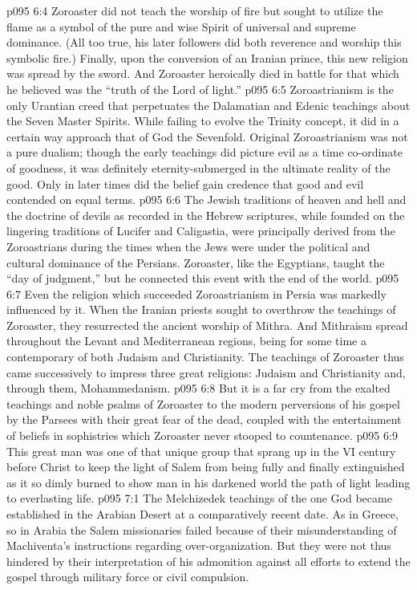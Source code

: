 \vs p095 6:4 Zoroaster did not teach the worship of fire but sought to utilize the flame as a symbol of the pure and wise Spirit of universal and supreme dominance. (All too true, his later followers did both reverence and worship this symbolic fire.) Finally, upon the conversion of an Iranian prince, this new religion was spread by the sword. And Zoroaster heroically died in battle for that which he believed was the “truth of the Lord of light.”
\vs p095 6:5 \pc Zoroastrianism is the only Urantian creed that perpetuates the Dalamatian and Edenic teachings about the Seven Master Spirits. While failing to evolve the Trinity concept, it did in a certain way approach that of God the Sevenfold. Original Zoroastrianism was not a pure dualism; though the early teachings did picture evil as a time co\hyp{}ordinate of goodness, it was definitely eternity\hyp{}submerged in the ultimate reality of the good. Only in later times did the belief gain credence that good and evil contended on equal terms.
\vs p095 6:6 The Jewish traditions of heaven and hell and the doctrine of devils as recorded in the Hebrew scriptures, while founded on the lingering traditions of Lucifer and Caligastia, were principally derived from the Zoroastrians during the times when the Jews were under the political and cultural dominance of the Persians. Zoroaster, like the Egyptians, taught the “day of judgment,” but he connected this event with the end of the world.
\vs p095 6:7 Even the religion which succeeded Zoroastrianism in Persia was markedly influenced by it. When the Iranian priests sought to overthrow the teachings of Zoroaster, they resurrected the ancient worship of Mithra. And Mithraism spread throughout the Levant and Mediterranean regions, being for some time a contemporary of both Judaism and Christianity. The teachings of Zoroaster thus came successively to impress three great religions: Judaism and Christianity and, through them, Mohammedanism.
\vs p095 6:8 \pc But it is a far cry from the exalted teachings and noble psalms of Zoroaster to the modern perversions of his gospel by the Parsees with their great fear of the dead, coupled with the entertainment of beliefs in sophistries which Zoroaster never stooped to countenance.
\vs p095 6:9 This great man was one of that unique group that sprang up in the VI century before Christ to keep the light of Salem from being fully and finally extinguished as it so dimly burned to show man in his darkened world the path of light leading to everlasting life.
\vs p095 7:1 The Melchizedek teachings of the one God became established in the Arabian Desert at a comparatively recent date. As in Greece, so in Arabia the Salem missionaries failed because of their misunderstanding of Machiventa’s instructions regarding over\hyp{}organization. But they were not thus hindered by their interpretation of his admonition against all efforts to extend the gospel through military force or civil compulsion.
